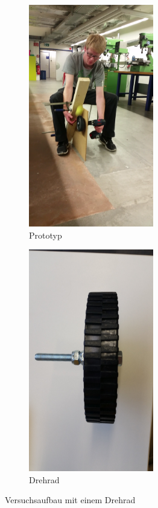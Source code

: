 \begin{figure}[h!]
	\centering
	\begin{subfigure}{.4\textwidth}
		\centering
		\includegraphics[width=0.6\textwidth]{../../fig/Versuch_Drehrad.png}
		\caption{Prototyp}
	\end{subfigure} %
	\begin{subfigure}{.4\textwidth}
		\centering
		\includegraphics[width=0.6\textwidth]{../../fig/Drehrad_1.jpg}
		\caption{Drehrad}
	\end{subfigure}
	\caption{Versuchsaufbau mit einem Drehrad}
	\label{fig:drehrad_versuch}
\end{figure}

